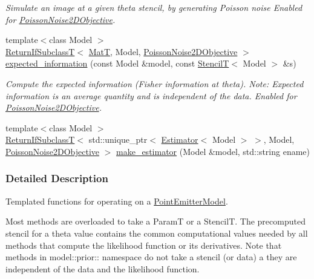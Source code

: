 \begin{DoxyCompactItemize}
\begin{DoxyCompactList}\small\item\em Simulate an image at a given theta stencil, by generating Poisson noise Enabled for \hyperlink{classmappel_1_1PoissonNoise2DObjective}{Poisson\+Noise2\+D\+Objective}. \end{DoxyCompactList}\item 
{\footnotesize template$<$class Model $>$ }\\\hyperlink{namespacemappel_a3b77d227658ba3ba9e16fea6fa6e626d}{Return\+If\+SubclassT}$<$ \hyperlink{namespacemappel_a7091ab87c528041f7e2027195fad8915}{MatT}, Model, \hyperlink{classmappel_1_1PoissonNoise2DObjective}{Poisson\+Noise2\+D\+Objective} $>$ \hyperlink{namespacemappel_1_1methods_abc7bb2a867d157f3adbb71abdd3680d2}{expected\+\_\+information} (const Model \&model, const \hyperlink{namespacemappel_a3a06598240007876f8c4bf834ad86197}{StencilT}$<$ Model $>$ \&s)
\begin{DoxyCompactList}\small\item\em Compute the expected information (Fisher information at theta). Note\+: Expected information is an average quantity and is independent of the data. Enabled for \hyperlink{classmappel_1_1PoissonNoise2DObjective}{Poisson\+Noise2\+D\+Objective}. \end{DoxyCompactList}\item 
{\footnotesize template$<$class Model $>$ }\\\hyperlink{namespacemappel_a3b77d227658ba3ba9e16fea6fa6e626d}{Return\+If\+SubclassT}$<$ std\+::unique\+\_\+ptr$<$ \hyperlink{classmappel_1_1Estimator}{Estimator}$<$ Model $>$ $>$, Model, \hyperlink{classmappel_1_1PoissonNoise2DObjective}{Poisson\+Noise2\+D\+Objective} $>$ \hyperlink{namespacemappel_1_1methods_acf60639ee5928d3a6eb44a017e57f2ec}{make\+\_\+estimator} (Model \&model, std\+::string ename)
\end{DoxyCompactItemize}


\subsubsection{Detailed Description}
Templated functions for operating on a \hyperlink{classmappel_1_1PointEmitterModel}{Point\+Emitter\+Model}. 

Most methods are overloaded to take a ParamT or a StencilT. The precomputed stencil for a theta value contains the common computational values needed by all methods that compute the likelihood function or its derivatives. Note that methods in model\+::prior\+:\+: namespace do not take a stencil (or data) a they are independent of the data and the likelihood function.

